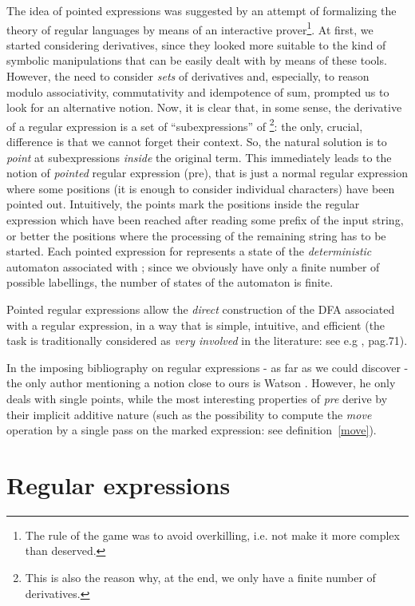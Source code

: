 \documentclass[preprint]{sigplanconf}
\begin{document}
The idea of pointed expressions was suggested 
by an attempt of formalizing the theory
of regular languages by means of an interactive prover\footnote{The rule
of the game was to avoid overkilling, i.e. not make it more complex
than deserved.}. At first,
we started considering derivatives, since they looked more suitable
to the kind of symbolic manipulations that can be easily dealt with 
by means of these tools. However, the need to consider {\em sets} of
derivatives and, especially, to reason modulo associativity, commutativity
and idempotence of sum, prompted us to look for an alternative notion.
Now, it is clear that, in some sense, the derivative of a regular expression
 is a set of  ``subexpressions'' of \footnote{This is also the reason why, at
the end, we only have a finite number of derivatives.}: the only, 
crucial, difference is that we cannot forget their context. So, the natural 
solution is to {\em point} at subexpressions {\em inside} the original term.
This immediately leads to the notion of {\em pointed} regular expression
(pre), that is just a normal regular expression where some positions
(it is enough to consider individual characters) have been pointed
out. Intuitively, the points mark the positions inside the regular
expression which have been reached after reading some prefix of
the input string, or better the positions where the processing
of the remaining string has to be started. Each pointed expression
for  represents a state of the {\em deterministic} automaton associated
with ; since we obviously have only a finite number of possible
labellings, the number of states of the automaton is finite.

Pointed regular expressions allow the {\em direct} construction of 
the DFA \cite{Kleene56}
associated with a regular expression, in a way that is
simple, intuitive, and efficient (the task is traditionally 
considered as {\em very involved} in the literature: see e.g
\cite{RS97}, pag.71).

In the imposing
bibliography on regular expressions - as far as we could discover -
the only author mentioning a notion close to ours is Watson \cite{Watson01,Watson02}. 
However, he only deals with single points, while the most 
interesting properties
of {\em pre} derive by their implicit additive nature (such as the
possibility to compute the {\em move} operation by a single pass on
the marked expression: see definition~\ref{move}).

\section{Regular expressions}
\end{document}
